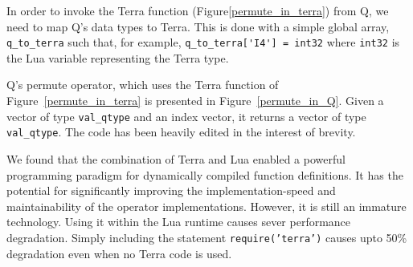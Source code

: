 In order to invoke the Terra function (Figure\ref{permute_in_terra}) from Q, we
need to map Q's data types to Terra. This is done with a simple global 
array, \verb+q_to_terra+ such that, for example, 
\verb+q_to_terra['I4'] = int32+  where {\tt int32} is the Lua variable representing the Terra type.

Q's permute operator, which uses the Terra function of
Figure~\ref{permute_in_terra} 
is presented in Figure~\ref{permute_in_Q}. 
Given a vector of type {\tt val\_qtype} and an index vector, it 
returns a vector of type {\tt val\_qtype}.
The code has been heavily edited in the interest of brevity.

\begin{figure}
\centering
{}
\end{figure}

We found that 
the combination of Terra and Lua enabled a powerful programming paradigm for
dynamically compiled function definitions. It has the potential for significantly improving the implementation-speed and maintainability of the operator implementations. 
However, it is
still an immature technology. Using it within the Lua runtime causes sever
performance degradation. Simply including the statement 
{\tt require('terra')} causes upto 50\% degradation even when no Terra code is
used. 

